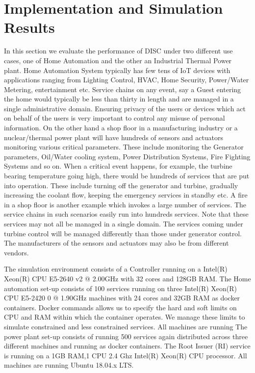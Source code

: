 \documentclass[journal]{IEEEtran}
\begin{document}
\section{Implementation and Simulation Results} \label{implementation}
In this section we evaluate the performance of DISC under two different use cases, one of Home Automation and the other an Industrial Thermal Power plant. Home Automation System typically has few tens of IoT devices with applications ranging from Lighting Control, HVAC, Home Security, Power/Water Metering, entertainment etc. Service chains on any event, say a Guest entering the home would typically be less than thirty in length and are managed in a single administrative domain. Ensuring privacy of the users or devices which act on behalf of the users is very important to control any misuse of personal information.
On the other hand a shop floor in a manufacturing industry or a nuclear/thermal power plant will have hundreds of sensors and actuators monitoring various critical parameters. These include monitoring the Generator parameters, Oil/Water cooling system, Power Distribution Systems, Fire Fighting Systems and so on. When a critical event happens, for example, the turbine bearing temperature going high, there would be hundreds of services that are put into operation. These include turning off the generator and turbine,  gradually increasing the coolant flow, keeping the emergency services in standby etc. A fire in a shop floor is another example which invokes a large number of services. The service chains in such scenarios easily run into hundreds services. Note that these services may not all be managed in a single domain. The services coming under turbine control will be managed differently than those under generator control. The manufacturers of the sensors and actuators may also be from different vendors.

The simulation environment consists of a Controller running on a Intel(R) Xeon(R) CPU E5-2640 v2 @ 2.00GHz with 32 cores and 128GB RAM. The Home automation set-up consists of 100 services running on three Intel(R) Xeon(R) CPU E5-2420 0 @ 1.90GHz machines with 24 cores and 32GB RAM as docker containers. Docker commands allows us to specify the hard and soft limits on CPU and RAM within which the container operates. We manage these limits to simulate constrained and less constrained services. All machines are running The power plant set-up consists of running 500 services again distributed across three different machines and running as docker containers. The Root Issuer (RI) service is running on a 1GB RAM,1 CPU 2.4 Ghz Intel(R) Xeon(R) CPU processor.  All machines are running Ubuntu 18.04.x LTS.
\end{document}
